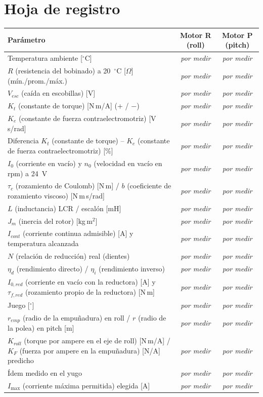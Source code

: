 \documentclass[11pt,a4paper]{article}
\newcommand{\pendiente}{\textit{por medir}}
\begin{document}
\section{Hoja de registro}
\label{sec:registro}

\begin{center}
\small
\begin{tabularx}{\linewidth}{>{\raggedright\arraybackslash}Xcc}
\toprule
Parámetro & Motor R (roll) & Motor P (pitch) \\
\midrule
Temperatura ambiente [$^\circ$C] & \pendiente & \pendiente \\
$R$ (resistencia del bobinado) a 20~$^\circ$C [$\Omega$] (mín./prom./máx.) & \pendiente & \pendiente \\
$V_{esc}$ (caída en escobillas) [V] & \pendiente & \pendiente \\
$K_t$ (constante de torque) [N\,m/A] (+ / $-$) & \pendiente & \pendiente \\
$K_e$ (constante de fuerza contraelectromotriz) [V\,s/rad] & \pendiente & \pendiente \\
Diferencia $K_t$ (constante de torque) -- $K_e$ (constante de fuerza contraelectromotriz) [\%] & \pendiente & \pendiente \\
$I_0$ (corriente en vacío) y $n_0$ (velocidad en vacío en rpm) a 24~V & \pendiente & \pendiente \\
$\tau_c$ (rozamiento de Coulomb) [N\,m] / $b$ (coeficiente de rozamiento viscoso) [N\,m\,s/rad] & \pendiente & \pendiente \\
$L$ (inductancia) LCR / escalón [mH] & \pendiente & \pendiente \\
$J_m$ (inercia del rotor) [kg\,m$^2$] & \pendiente & \pendiente \\
$I_{cont}$ (corriente continua admisible) [A] y temperatura alcanzada & \pendiente & \pendiente \\
\midrule
$N$ (relación de reducción) real (dientes) & \pendiente & \pendiente \\
$\eta_d$ (rendimiento directo) / $\eta_i$ (rendimiento inverso) & \pendiente & \pendiente \\
$I_{0,red}$ (corriente en vacío con la reductora) [A] y $\tau_{f,red}$ (rozamiento propio de la reductora) [N\,m] & \pendiente & \pendiente \\
Juego [$^\circ$] & \pendiente & \pendiente \\
\midrule
$r_{emp}$ (radio de la empuñadura) en roll / $r$ (radio de la polea) en pitch [m] & \pendiente & \pendiente \\
$K_{roll}$ (torque por ampere en el eje de roll) [N\,m/A] / $K_F$ (fuerza por ampere en la empuñadura) [N/A] predicho & \pendiente & \pendiente \\
Ídem medido en el yugo & \pendiente & \pendiente \\
$I_{\max}$ (corriente máxima permitida) elegida [A] & \pendiente & \pendiente \\
\bottomrule
\end{tabularx}
\end{center}
\end{document}
